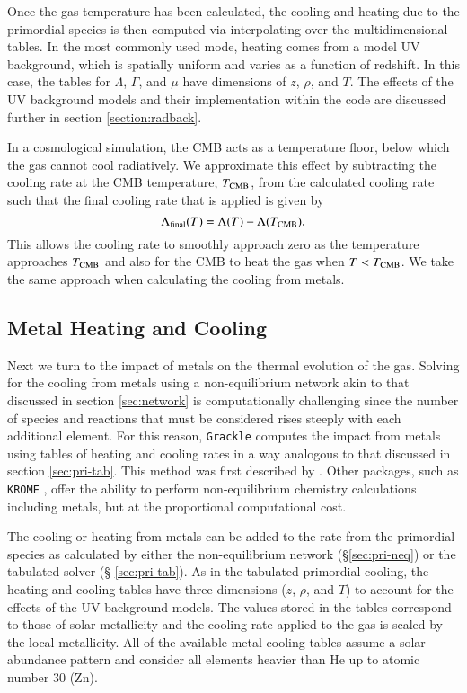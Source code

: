 Once the gas temperature has been calculated, the cooling and heating
due to the primordial species is then computed via interpolating over
the multidimensional tables.  In the most commonly used mode, heating
comes from a model UV background, which is spatially uniform and
varies as a function of redshift.  In this case, the tables for
$\Lambda$, $\Gamma$, and $\mu$ have dimensions of $z$, $\rho$, and
$T$.  The effects of the UV background models and their implementation
within the code are discussed further in section
\ref{section:radback}.

In a cosmological simulation, the CMB acts as a temperature floor,
below which the gas cannot cool radiatively.  We approximate this effect by
subtracting the cooling rate at the CMB temperature, $T_{\rm CMB}$, from
the calculated cooling rate such that the final cooling rate that is
applied is given by
\begin{equation}
\Lambda_{\rm final}(T) = \Lambda(T) - \Lambda(T_{\rm CMB}).
\end{equation}
This allows the cooling rate to smoothly approach zero as the
temperature approaches $T_{\rm CMB}$ and also for the CMB to heat the gas
when $T < T_{\rm CMB}$.  We take the same approach when calculating the
cooling from metals.


\subsection{Metal Heating and Cooling}

Next we turn to the impact of metals on the thermal evolution of the gas.
Solving for the cooling from metals using a non-equilibrium network
akin to that discussed in section \ref{sec:network} is computationally
challenging since the number of species and reactions that must be
considered rises steeply with each additional element.  For this
reason, \texttt{Grackle} computes the impact from metals using tables of
heating and cooling rates in a way analogous to that discussed in section
\ref{sec:pri-tab}.  This method was first described by
\citet{2008MNRAS.385.1443S}.  Other packages, such as \texttt{KROME}
\citep{2014MNRAS.439.2386G}, offer the ability to perform
non-equilibrium chemistry calculations including metals, but at the
proportional computational cost.

The cooling or heating from metals can be added to the rate from the
primordial species as calculated by either the non-equilibrium network
(\S \ref{sec:pri-neq}) or the tabulated solver (\S
\ref{sec:pri-tab}).  As in the tabulated primordial cooling, the
heating and cooling tables have three dimensions ($z$, $\rho$, and
$T$) to account for the effects of the UV background models.  The
values stored in the tables correspond to those of solar metallicity
and the cooling rate applied to the gas is scaled by the local
metallicity.  All of the available metal cooling tables assume a solar
abundance pattern and consider all elements heavier than He up to
atomic number 30 (Zn).

